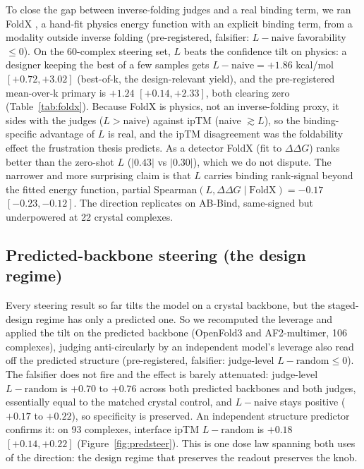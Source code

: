 \documentclass{article} %
\begin{document}
To close the gap between inverse-folding judges and a real binding term, we ran FoldX \citep{guerois2002foldx, schymkowitz2005foldx, delgado2019foldx5}, a hand-fit physics energy function with an explicit binding term,
from a modality outside inverse folding (pre-registered, falsifier: $L - \text{naive}$ favorability $\le 0$). On
the 60-complex steering set, $L$ beats the confidence tilt on physics: a designer keeping the best of a few
samples gets $L - \text{naive} = +1.86$ kcal/mol $[+0.72, +3.02]$ (best-of-k, the design-relevant yield), and the
pre-registered mean-over-k primary is $+1.24$ $[+0.14, +2.33]$, both clearing zero (Table~\ref{tab:foldx}).
Because FoldX is physics, not an inverse-folding proxy, it sides with the judges ($L > \text{naive}$) against ipTM
(naive $\gtrsim L$), so the binding-specific advantage of $L$ is real, and the ipTM disagreement was the
foldability effect the frustration thesis predicts. As a detector FoldX (fit to $\Delta\Delta G$) ranks better
than the zero-shot $L$ ($|0.43|$ vs $|0.30|$), which we do not dispute. The narrower and more surprising claim is
that $L$ carries binding rank-signal beyond the fitted energy function, partial Spearman$(L, \Delta\Delta G \mid
\text{FoldX}) = -0.17$ $[-0.23, -0.12]$. The direction replicates on AB-Bind, same-signed but underpowered at 22
crystal complexes.



\subsection{Predicted-backbone steering (the design regime)}

Every steering result so far tilts the model on a crystal backbone, but the staged-design regime has only a
predicted one. So we recomputed the leverage and applied the tilt on the predicted backbone (OpenFold3 and
AF2-multimer, 106 complexes), judging anti-circularly by an independent model's leverage also read off the
predicted structure (pre-registered, falsifier: judge-level $L - \text{random} \le 0$). The falsifier does not
fire and the effect is barely attenuated: judge-level $L - \text{random}$ is $+0.70$ to $+0.76$ across both
predicted backbones and both judges, essentially equal to the matched crystal control, and $L - \text{naive}$
stays positive ($+0.17$ to $+0.22$), so specificity is preserved. An independent structure predictor confirms it:
on 93 complexes, interface ipTM $L - \text{random}$ is $+0.18$ $[+0.14, +0.22]$ (Figure~\ref{fig:predsteer}). This
is one dose law spanning both uses of the direction: the design regime that preserves the readout preserves the
knob.
\end{document}
